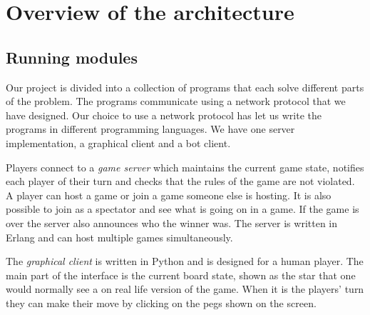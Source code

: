 \documentclass[a4paper,11pt]{article}
\begin{document}


\section{Overview of the architecture}
\subsection{Running modules}

Our project is divided into a collection of programs that each solve
different parts of the problem. The programs communicate using a
network protocol that we have designed. Our choice to use a network
protocol has let us write the programs in different programming
languages. We have one server implementation, a graphical client and a
bot client.


Players connect to a \emph{game server} which maintains the current
game state, notifies each player of their turn and checks that the
rules of the game are not violated. A player can host a game or join a
game someone else is hosting. It is also possible to join as a
spectator and see what is going on in a game. If the game is over the
server also announces who the winner was. The server is written in
Erlang and can host multiple games simultaneously.

The \emph{graphical client} is written in Python and is designed for a
human player. The main part of the interface is the current board
state, shown as the star that one would normally see a on real life
version of the game. When it is the players' turn they can make their
move by clicking on the pegs shown on the screen.
\end{document}
